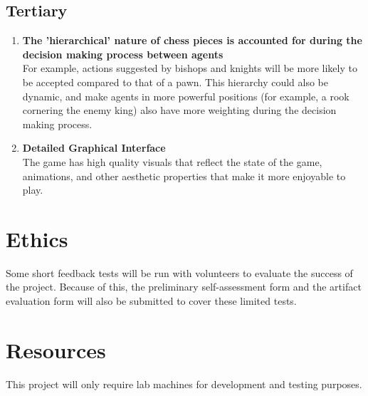 \documentclass[12pt]{extarticle}
\newcommand\descitem[1]{\item{\bfseries #1}\\}
\begin{document}
\subsection*{Tertiary}

\begin{enumerate}

		\descitem{The 'hierarchical' nature of chess pieces is accounted for during the decision making process between agents}
		For example, actions suggested by bishops and knights will be more likely to be accepted compared to that of a pawn. This hierarchy could also be dynamic, and make agents in more powerful positions (for example, a rook cornering the enemy king) also have more weighting during the decision making process.

		\descitem{Detailed Graphical Interface}
		The game has high quality visuals that reflect the state of the game, animations, and other aesthetic properties that make it more enjoyable to play.

\end{enumerate}

\section*{Ethics}

Some short feedback tests will be run with volunteers to evaluate the success of the project. Because of this, the preliminary self-assessment form and the artifact evaluation form will also be submitted to cover these limited tests.

\section*{Resources}

This project will only require lab machines for development and testing purposes.
\end{document}
